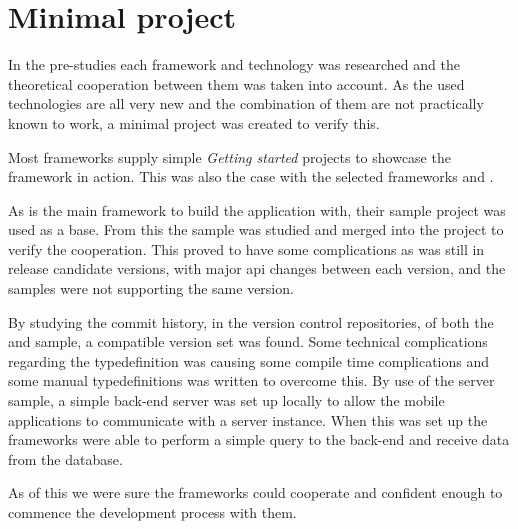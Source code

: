 \section{Minimal project}
In the pre-studies each framework and technology was researched and the theoretical cooperation between them was taken into account.
As the used technologies are all very new and the combination of them are not practically known to work, a minimal project was created to verify this.

Most frameworks supply simple \textit{Getting started} projects to showcase the framework in action.
This was also the case with the selected frameworks  \citep{minimalProject:sample:nativescript} and  \citep{minimalProject:sample:apollo}.

As  is the main framework to build the application with, their sample project was used as a base.
From this the  sample was studied and merged into the project to verify the cooperation.
This proved to have some complications as  was still in release candidate versions, with major \gls{api} changes between each version, and the samples were not supporting the same version.

By studying the commit history, in the  version control repositories, of both the  and  sample, a compatible version set was found.
Some technical complications regarding the \gls{typedefinition} was causing some compile time complications and some manual \glspl{typedefinition} was written to overcome this.
By use of the  server sample, a simple back-end server was set up locally to allow the mobile applications to communicate with a server instance.
When this was set up the frameworks were able to perform a simple query to the back-end and receive data from the database.

As of this we were sure the frameworks could cooperate and confident enough to commence the development process with them.

